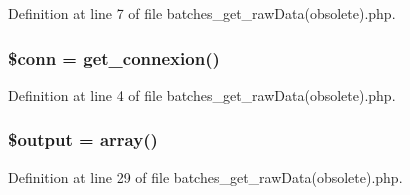 Definition at line 7 of file batches\-\_\-get\-\_\-raw\-Data(obsolete).\-php.

\hypertarget{batches__get__raw_data_07obsolete_08_8php_aa8a5a87b9c1a6a0819b88447cbe41877}{
\subsubsection[{\$conn}]{\setlength{\rightskip}{0pt plus 5cm}\$conn = {\bf get\-\_\-connexion}()}}\label{batches__get__raw_data_07obsolete_08_8php_aa8a5a87b9c1a6a0819b88447cbe41877}


Definition at line 4 of file batches\-\_\-get\-\_\-raw\-Data(obsolete).\-php.

\hypertarget{batches__get__raw_data_07obsolete_08_8php_a73004ce9cd673c1bfafd1dc351134797}{
\subsubsection[{\$output}]{\setlength{\rightskip}{0pt plus 5cm}\$output = array()}}\label{batches__get__raw_data_07obsolete_08_8php_a73004ce9cd673c1bfafd1dc351134797}


Definition at line 29 of file batches\-\_\-get\-\_\-raw\-Data(obsolete).\-php.

